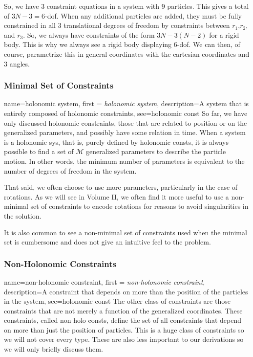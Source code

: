 \documentclass[12pt]{report}
\begin{document}
So, we have 3 constraint equations in a system with 9 particles. This gives a total of $3N-3=6$-\gls{dof}. When any additional particles are added, they must be fully constrained in all 3 translational degrees of freedom by constraints between $r_1$,$r_2$, and $r_3$. So, we always have constraints of the form $3N-3(N-2)$ for a \gls{rigid body}. This is why we always see a \gls{rigid body} displaying 6-\gls{dof}. We can then, of course, parametrize this in general coordinates with the cartesian coordinates and 3 angles.

\subsubsection{Minimal Set of Constraints}

{
    name=holonomic system,
    first = {\textit{holonomic system}},
    description={A system that is entirely composed of holonomic constraints},
    see={holonomic const}
}
So far, we have only discussed holonomic constraints, those that are related to position or on the generalized parameters, and possibly have some relation in time. When a system is a \gls{holonomic sys}, that is, purely defined by \glspl{holonomic const}, it is always possible to find a set of $\mathcal{M}$ generalized parameters to describe the particle motion. In other words, the minimum number of parameters is equivalent to the number of degrees of freedom in the system.

That said, we often choose to use more parameters, particularly in the case of rotations. As we will see in Volume II, we often find it more useful to use a non-minimal set of constraints to encode rotations for reasons to avoid singularities in the solution.

It is also common to see a non-minimal set of constraints used when the minimal set is cumbersome and does not give an intuitive feel to the problem.
\subsubsection{Non-Holonomic Constraints}

{
    name=non-holonomic constraint,
    first = {\textit{non-holonomic constraint}},
    description={A constraint that depends on more than the position of the particles in the system},
    see={holonomic const}
}
The other class of constraints are those constraints that are not merely a function of the generalized coordinates. These constraints, called \glspl{non holo const}, define the set of all constraints that depend on more than just the position of particles. This is a huge class of constraints so we will not cover every type. These are also less important to our derivations so we will only briefly discuss them.
\end{document}
